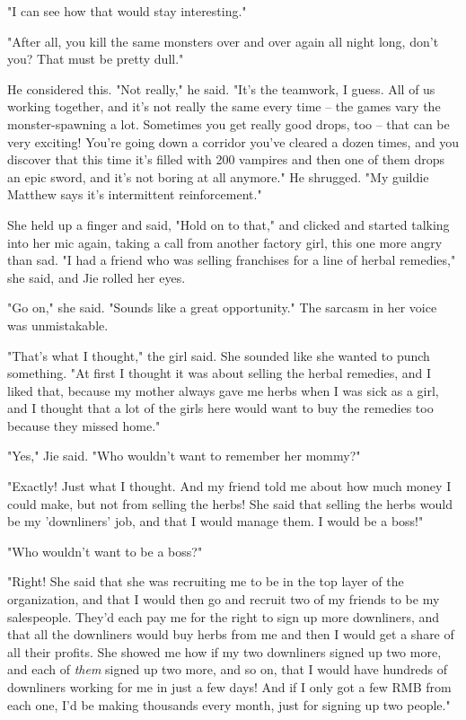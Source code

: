 "I can see how that would stay interesting."

"After all, you kill the same monsters over and over again all
night long, don't you? That must be pretty dull."

He considered this. "Not really," he said. "It's the teamwork, I
guess. All of us working together, and it's not really the same
every time -- the games vary the monster-spawning a lot. Sometimes
you get really good drops, too -- that can be very exciting! You're
going down a corridor you've cleared a dozen times, and you
discover that this time it's filled with 200 vampires and then one
of them drops an epic sword, and it's not boring at all anymore."
He shrugged. "My guildie Matthew says it's intermittent
reinforcement."

She held up a finger and said, "Hold on to that," and clicked and
started talking into her mic again, taking a call from another
factory girl, this one more angry than sad. "I had a friend who was
selling franchises for a line of herbal remedies," she said, and
Jie rolled her eyes.

"Go on," she said. "Sounds like a great opportunity." The sarcasm
in her voice was unmistakable.

"That's what I thought," the girl said. She sounded like she wanted
to punch something. "At first I thought it was about selling the
herbal remedies, and I liked that, because my mother always gave me
herbs when I was sick as a girl, and I thought that a lot of the
girls here would want to buy the remedies too because they missed
home."

"Yes," Jie said. "Who wouldn't want to remember her mommy?"

"Exactly! Just what I thought. And my friend told me about how much
money I could make, but not from selling the herbs! She said that
selling the herbs would be my 'downliners' job, and that I would
manage them. I would be a boss!"

"Who wouldn't want to be a boss?"

"Right! She said that she was recruiting me to be in the top layer
of the organization, and that I would then go and recruit two of my
friends to be my salespeople. They'd each pay me for the right to
sign up more downliners, and that all the downliners would buy
herbs from me and then I would get a share of all their profits.
She showed me how if my two downliners signed up two more, and each
of \emph{them} signed up two more, and so on, that I would have
hundreds of downliners working for me in just a few days! And if I
only got a few RMB from each one, I'd be making thousands every
month, just for signing up two people."


